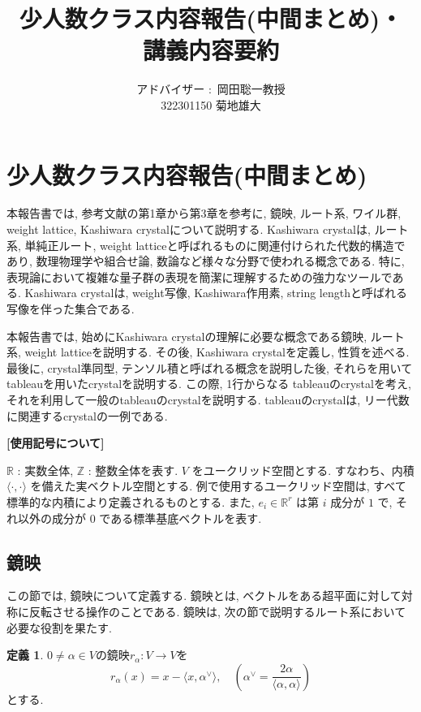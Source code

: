 \documentclass[
  a4paper, 
  12pt,
  ja=standard,
  xelatex,
  left=30truemm,
  right=30truemm,
  titlepage 
]{bxjsarticle}
\title{少人数クラス内容報告(中間まとめ)・\\ 講義内容要約}
\author{アドバイザー $\colon$ 岡田聡一教授 \\[50pt]
322301150 \quad 菊地雄大}
\date{}
\theoremstyle{definition}
\newtheorem{df}{定義}
\begin{document}
\maketitle
%
%
\section{少人数クラス内容報告(中間まとめ)}
  本報告書では, 参考文献\cite{b1}の第1章から第3章を参考に, 鏡映, ルート系, ワイル群, weight lattice, Kashiwara crystalについて説明する.
  Kashiwara crystalは, ルート系, 単純正ルート, weight latticeと呼ばれるものに関連付けられた代数的構造であり, 数理物理学や組合せ論, 数論など様々な分野で使われる概念である. 
  特に, 表現論において複雑な量子群の表現を簡潔に理解するための強力なツールである. Kashiwara crystalは, weight写像, Kashiwara作用素, string lengthと呼ばれる写像を伴った集合である.

  本報告書では, 始めにKashiwara crystalの理解に必要な概念である鏡映, ルート系, weight latticeを説明する. その後, Kashiwara crystalを定義し, 性質を述べる. 
  最後に, crystal準同型, テンソル積と呼ばれる概念を説明した後, それらを用いてtableauを用いたcrystalを説明する. 
  この際, 1行からなる tableauのcrystalを考え, それを利用して一般のtableauのcrystalを説明する. tableauのcrystalは, リー代数に関連するcrystalの一例である. 
  \begin{center} \textbf{[使用記号について]} \end{center}

  $\mathbb{R}$ : 実数全体, $\mathbb{Z}$ : 整数全体を表す.
  $V$ をユークリッド空間とする. すなわち、内積 $\langle \cdot, \cdot \rangle$ を備えた実ベクトル空間とする. 例で使用するユークリッド空間は, すべて標準的な内積により定義されるものとする.
  また, $e_i \in \mathbb{R}^r$ は第 $i$ 成分が $1$ で, それ以外の成分が $0$ である標準基底ベクトルを表す.
%
\subsection{鏡映}
  この節では, 鏡映について定義する. 鏡映とは, ベクトルをある超平面に対して対称に反転させる操作のことである. 鏡映は, 次の節で説明するルート系において必要な役割を果たす.
\bigskip

\begin{df}
  $0 \neq  \alpha \in V $の鏡映$r_\alpha: V \to V $を
  \[
  r_\alpha (x) = x - \langle x , \alpha^{ \vee } \rangle, \quad \left( \alpha^{ \vee } = \frac{2 \alpha}{\langle \alpha, \alpha \rangle} \right)
  \]
  とする.
\end{df}
\end{document}
